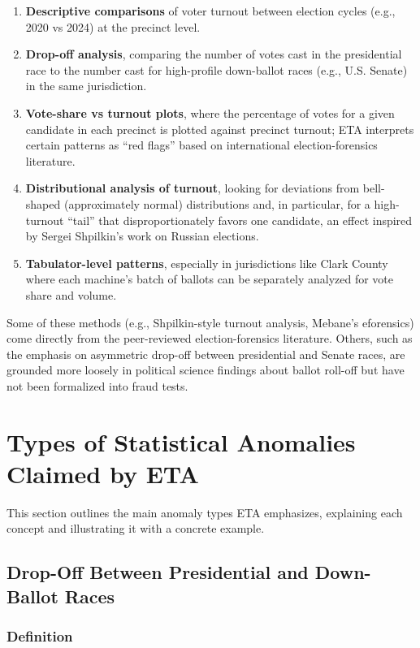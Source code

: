 \documentclass[12pt]{article}
\begin{document}
\begin{enumerate}
    \item \textbf{Descriptive comparisons} of voter turnout between election cycles (e.g., 2020 vs 2024) at the precinct level.
    \item \textbf{Drop-off analysis}, comparing the number of votes cast in the presidential race to the number cast for high-profile down-ballot races (e.g., U.S. Senate) in the same jurisdiction.
    \item \textbf{Vote-share vs turnout plots}, where the percentage of votes for a given candidate in each precinct is plotted against precinct turnout; ETA interprets certain patterns as ``red flags'' based on international election-forensics literature.
    \item \textbf{Distributional analysis of turnout}, looking for deviations from bell-shaped (approximately normal) distributions and, in particular, for a high-turnout ``tail'' that disproportionately favors one candidate, an effect inspired by Sergei Shpilkin's work on Russian elections.
    \item \textbf{Tabulator-level patterns}, especially in jurisdictions like Clark County where each machine's batch of ballots can be separately analyzed for vote share and volume.
\end{enumerate}

Some of these methods (e.g., Shpilkin-style turnout analysis, Mebane's eforensics) come directly from the peer-reviewed election-forensics literature. Others, such as the emphasis on asymmetric drop-off between presidential and Senate races, are grounded more loosely in political science findings about ballot roll-off but have not been formalized into fraud tests.

\section{Types of Statistical Anomalies Claimed by ETA}

This section outlines the main anomaly types ETA emphasizes, explaining each concept and illustrating it with a concrete example.

\subsection{Drop-Off Between Presidential and Down-Ballot Races}

\subsubsection{Definition}
\end{document}
